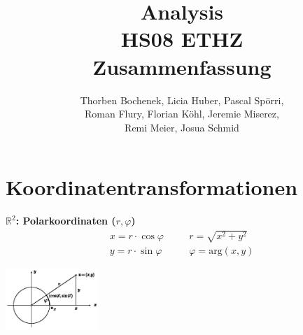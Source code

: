 \documentclass[a4paper]{article}
\title{Analysis\\HS08 ETHZ\\Zusammenfassung}
\author{Thorben Bochenek, Licia Huber, Pascal Spörri, \\Roman Flury, Florian Köhl, Jeremie Miserez,\\Remi Meier, Josua Schmid
}
\begin{document}
\section{Koordinatentransformationen}
        \vspace{-5mm}
    \begin{multicols}{2}
	\textbf{$\mathbb{R}^2$: Polarkoordinaten ($r, \varphi$)}
		\vspace{-2mm}
		\begin{eqnarray*}
				x = r \cdot \cos \varphi &\quad& r = \sqrt{x^2 + y^2}\\
				y = r \cdot \sin \varphi &\quad& \varphi = \text{arg}(x,y) 
		\end{eqnarray*}
		\vspace{-2mm}
		
		\hspace{8mm}
		\includegraphics[width=3.5cm]{Koordinaten_Polar.jpg}
    \end{multicols}
\end{document}
